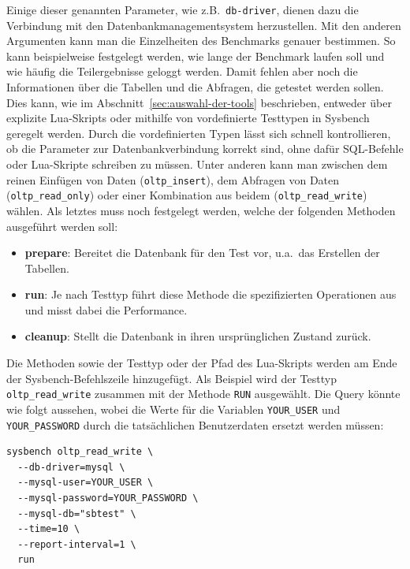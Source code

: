 Einige dieser genannten Parameter, wie z.B.\ \texttt{db-driver}, dienen dazu die Verbindung mit den Datenbankmanagementsystem herzustellen.
Mit den anderen Argumenten kann man die Einzelheiten des Benchmarks genauer bestimmen.
So kann beispielweise festgelegt werden, wie lange der Benchmark laufen soll und wie häufig die Teilergebnisse geloggt werden.
Damit fehlen aber noch die Informationen über die Tabellen und die Abfragen, die getestet werden sollen.
Dies kann, wie im Abschnitt~\ref{sec:auswahl-der-tools} beschrieben, entweder über explizite Lua-Skripts oder mithilfe von vordefinierte Testtypen in Sysbench geregelt werden.
Durch die vordefinierten Typen lässt sich schnell kontrollieren, ob die Parameter zur Datenbankverbindung korrekt sind, ohne dafür SQL-Befehle oder Lua-Skripte schreiben zu müssen.
Unter anderen kann man zwischen dem reinen Einfügen von Daten (\texttt{oltp\_insert}), dem Abfragen von Daten (\texttt{oltp\_read\_only}) oder einer Kombination aus beidem (\texttt{oltp\_read\_write}) wählen.
Als letztes muss noch festgelegt werden, welche der folgenden Methoden ausgeführt werden soll:

\begin{itemize}
    \setlength{\itemsep}{-3pt}
    \item \textbf{prepare}: Bereitet die Datenbank für den Test vor, u.a.\ das Erstellen der Tabellen.
    \item \textbf{run}: Je nach Testtyp führt diese Methode die spezifizierten Operationen aus und misst dabei die Performance.
    \item \textbf{cleanup}: Stellt die Datenbank in ihren ursprünglichen Zustand zurück.
\end{itemize}

Die Methoden sowie der Testtyp oder der Pfad des Lua-Skripts werden am Ende der Sysbench-Befehlszeile hinzugefügt.
Als Beispiel wird der Testtyp \texttt{oltp\_read\_write} zusammen mit der Methode \texttt{RUN} ausgewählt.
Die Query könnte wie folgt aussehen, wobei die Werte für die Variablen \texttt{YOUR\_USER} und \texttt{YOUR\_PASSWORD} durch die tatsächlichen Benutzerdaten ersetzt werden müssen:

\vspace{-5pt}
\begin{lstlisting}[style=custom_daniel,label={lst:tools-sysbench-run}]
sysbench oltp_read_write \
  --db-driver=mysql \
  --mysql-user=YOUR_USER \
  --mysql-password=YOUR_PASSWORD \
  --mysql-db="sbtest" \
  --time=10 \
  --report-interval=1 \
  run
\end{lstlisting}
\vspace{-5pt}

